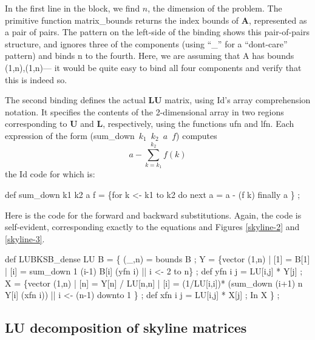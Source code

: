 In the first line in the block, we find $n$, the dimension of the
problem. The primitive function {\cf matrix\_bounds} returns the index
bounds of {\bf A}, represented as a pair of pairs. The pattern on the
left-side of the binding shows this pair-of-pairs structure, and
ignores three of the components (using ``{\cf \_}'' for a
``dont-care'' pattern) and binds {\cf n} to the fourth.  Here, we are
assuming that {\cf A} has bounds (1,n),(1,n)--- it would be quite easy
to bind all four components and verify that this is indeed so.

The second binding defines the actual {\bf LU} matrix, using Id's
array comprehension notation.  It specifies the contents of the
2-dimensional array in two regions corresponding to {\bf U} and {\bf
L}, respectively, using the functions {\cf ufn} and {\cf lfn}.  Each
expression of the form \mbox{\cf (sum\_down $k_1$ $k_2$ $a$ $f$)}
computes
\[
a - \sum_{k=k_1}^{k_2}{f(k)}
\]
the Id code for which is:

\begin{minipage}{\textwidth}
 \begin{idenv}
def sum\_down k1 k2 a f = \{for k <- k1 to k2 do
                            next a = a - (f k)
                          finally a \} ;
 \end{idenv}
\end{minipage}

Here is the code for the forward and backward substitutions.  Again,
the code is self-evident, corresponding exactly to the equations and
Figures \ref{skyline-2} and \ref{skyline-3}.

\begin{minipage}{\textwidth}
 \begin{idenv}
def LUBKSB\_dense LU B =
  \{ (\_,n) = bounds B ;
\null
    Y = \{vector (1,n)
         | [1] = B[1]
         | [i] = sum\_down 1 (i-1) B[i] (yfn i) || i <- 2 to n\} ;
\null
    def yfn i j = LU[i,j] * Y[j] ;
\null
    X = \{vector (1,n)
         | [n] = Y[n] / LU[n,n]
         | [i] = (1/LU[i,i])*
                 (sum\_down (i+1) n Y[i] (xfn i)) || i <- (n-1) downto 1 \} ;
\null
    def xfn i j = LU[i,j] * X[j] ;
   In
     X \} ;
 \end{idenv}
\end{minipage}


\subsection{LU decomposition of skyline matrices}

